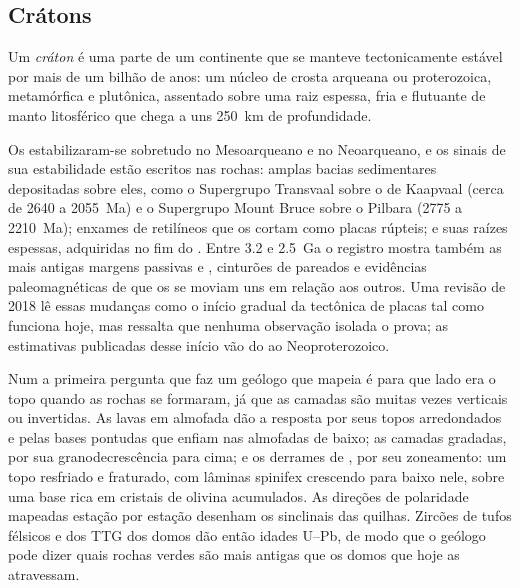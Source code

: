 \subsection*{Crátons}

\begin{definition}[Cráton]\label{def:b2:precambrian-earth:craton}
Um \emph{cráton} é uma parte de um continente que se manteve tectonicamente estável
por mais de um bilhão de anos: um núcleo de crosta arqueana ou proterozoica, metamórfica e
plutônica, assentado sobre uma raiz espessa, fria e flutuante de manto litosférico que chega a uns
\qty{250}{km} de profundidade.
\end{definition}

Os  estabilizaram-se sobretudo no Mesoarqueano e no Neoarqueano, e os sinais de sua
estabilidade estão escritos nas rochas: amplas bacias sedimentares depositadas sobre eles, como o
Supergrupo Transvaal sobre o  de Kaapvaal (cerca de 2640 a \qty{2055}{Ma}) e o Supergrupo Mount Bruce
sobre o Pilbara (2775 a \qty{2210}{Ma}); enxames de  retilíneos que os cortam como
placas rúpteis; e suas raízes espessas, adquiridas no fim do . Entre 3.2 e
\qty{2.5}{Ga} o registro mostra também as mais antigas margens passivas e , cinturões
de  pareados e evidências paleomagnéticas de que os  se moviam uns em relação aos outros.
Uma revisão de 2018 lê essas mudanças como o início gradual da tectônica de placas tal como funciona
hoje, mas ressalta que nenhuma observação isolada o prova; as estimativas publicadas desse
início vão do  ao Neoproterozoico.

\begin{inthefield}
Num  a primeira pergunta que faz um geólogo que mapeia é para que lado era o topo quando as
rochas se formaram, já que as camadas são muitas vezes verticais ou invertidas. As lavas em almofada dão a resposta
por seus topos arredondados e pelas bases pontudas que enfiam nas almofadas de baixo; as camadas gradadas, por
sua granodecrescência para cima; e os derrames de , por seu zoneamento: um topo resfriado e fraturado, com
lâminas spinifex crescendo para baixo nele, sobre uma base rica em cristais de olivina acumulados. As direções
de polaridade mapeadas estação por estação desenham os sinclinais das quilhas. Zircões de tufos félsicos
e dos TTG dos domos dão então idades U--Pb, de modo que o geólogo pode dizer quais
rochas verdes são mais antigas que os domos que hoje as atravessam.
\end{inthefield}

